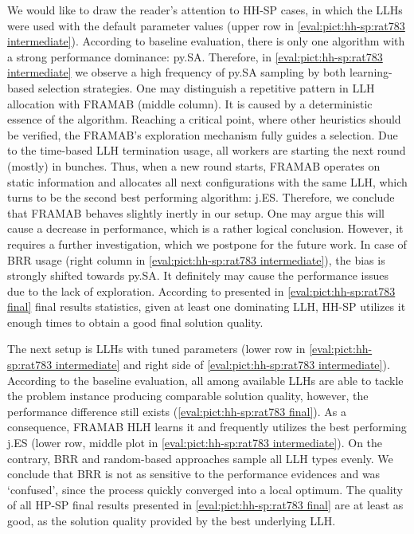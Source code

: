We would like to draw the reader's attention to HH-SP cases, in which the LLHs were used with the default parameter values (upper row in \cref{eval:pict:hh-sp:rat783 intermediate}). According to baseline evaluation, there is only one algorithm with a strong performance dominance: py.SA. Therefore, in \cref{eval:pict:hh-sp:rat783 intermediate} we observe a high frequency of py.SA sampling by both learning-based selection strategies. One may distinguish a repetitive pattern in LLH allocation with FRAMAB (middle column). It is caused by a deterministic essence of the algorithm. Reaching a critical point, where other heuristics should be verified, the FRAMAB's exploration mechanism fully guides a selection. Due to the time-based LLH termination usage, all workers are starting the next round (mostly) in bunches. Thus, when a new round starts, FRAMAB operates on static information and allocates all next configurations with the same LLH, which turns to be the second best performing algorithm: j.ES. Therefore, we conclude that FRAMAB behaves slightly inertly in our setup. One may argue this will cause a decrease in performance, which is a rather logical conclusion. However, it requires a further investigation, which we postpone for the future work. In case of BRR usage (right column in \cref{eval:pict:hh-sp:rat783 intermediate}), the bias is strongly shifted towards py.SA. It definitely may cause the performance issues due to the lack of exploration. According to presented in \cref{eval:pict:hh-sp:rat783 final} final results statistics, given at least one dominating LLH, HH-SP utilizes it enough times to obtain a good final solution quality.

The next setup is LLHs with tuned parameters (lower row in \cref{eval:pict:hh-sp:rat783 intermediate} and right side of \cref{eval:pict:hh-sp:rat783 intermediate}). According to the baseline evaluation, all among available LLHs are able to tackle the problem instance producing comparable solution quality, however, the performance difference still exists (\cref{eval:pict:hh-sp:rat783 final}). As a consequence, FRAMAB HLH learns it and frequently utilizes the best performing j.ES (lower row, middle plot in \cref{eval:pict:hh-sp:rat783 intermediate}). On the contrary, BRR and random-based approaches sample all LLH types evenly. We conclude that BRR is not as sensitive to the performance evidences and was `confused', since the process quickly converged into a local optimum. The quality of all HP-SP final results presented in \cref{eval:pict:hh-sp:rat783 final} are at least as good, as the solution quality provided by the best underlying LLH.

